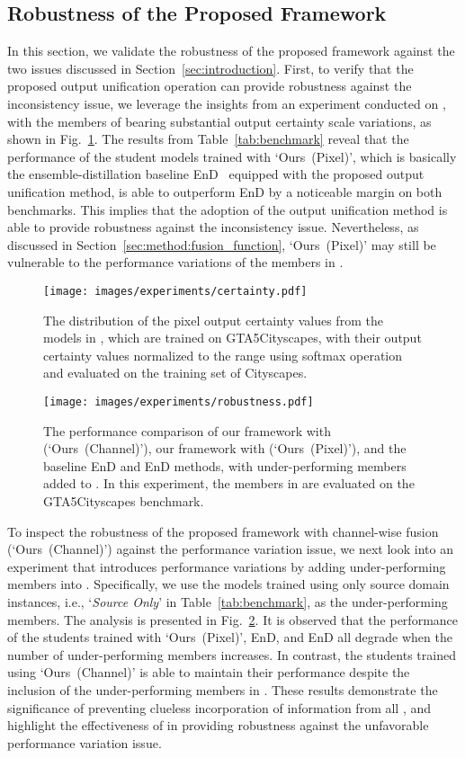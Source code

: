 \documentclass[final]{cvpr}
\begin{document}
\subsection{Robustness of the Proposed Framework}
\label{sec:experiments:robustness}
In this section, we validate the robustness of the proposed framework against the two issues discussed in Section~\ref{sec:introduction}. First, to verify that the proposed output unification operation can provide robustness against the inconsistency issue, we leverage the insights from an experiment conducted on , with the members of   bearing substantial output certainty scale variations, as shown in Fig.~\ref{fig:certainty}. The results from Table~\ref{tab:benchmark} reveal that the performance of the student models trained with `Ours~(Pixel)', which is basically the ensemble-distillation baseline EnD~\cite{hinton2015distilling} equipped with the proposed output unification method, is able to outperform EnD by a noticeable margin on both benchmarks. This implies that the adoption of the output unification method is able to provide robustness against the inconsistency issue. Nevertheless, as discussed in Section~\ref{sec:method:fusion_function}, `Ours~(Pixel)' may still be vulnerable to the performance variations of the members in .
\begin{figure}[t]\texttt{[image: images/experiments/certainty.pdf]}
    \caption{The distribution of the pixel output certainty values from the models in , which are trained on GTA5Cityscapes, with their output certainty values normalized to the range  using softmax operation and evaluated on the training set of Cityscapes.}
    \label{fig:certainty}
\end{figure}

\begin{figure}[t]\texttt{[image: images/experiments/robustness.pdf]}
    \caption{The performance comparison of our framework with  (`Ours~(Channel)'), our framework with  (`Ours~(Pixel)'), and the baseline EnD and EnD methods, with under-performing members added to . In this experiment, the members in  are evaluated on the GTA5Cityscapes benchmark.}
    \label{fig:robustness}
\end{figure}
\vspace{-1.5em} 
To inspect the robustness of the proposed framework with channel-wise fusion (`Ours~(Channel)') against the performance variation issue, we next look into an experiment that introduces performance variations by adding under-performing members into . Specifically, we use the models trained using only source domain instances, i.e., `\textit{Source Only}' in Table~\ref{tab:benchmark}, as the under-performing members. The analysis is presented in Fig.~\ref{fig:robustness}. It is observed that the performance of the students trained with `Ours~(Pixel)', EnD, and EnD all degrade when the number of under-performing members increases. In contrast, the students trained using `Ours~(Channel)' is able to maintain their performance despite the inclusion of the under-performing members in  . These results demonstrate the significance of preventing clueless incorporation of information from all , and highlight the effectiveness of  in providing robustness against the unfavorable performance variation issue.
\end{document}
